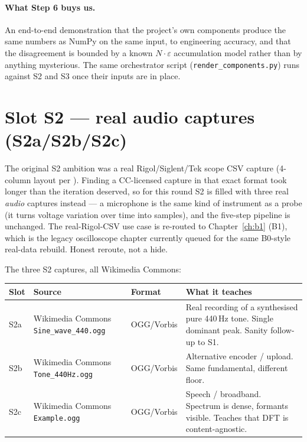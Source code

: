 \documentclass[11pt,a4paper,openany]{book}
\begin{document}
\paragraph{What Step 6 buys us.} An end-to-end demonstration that the
project's own components produce the same numbers as NumPy on the same
input, to engineering accuracy, and that the disagreement is bounded
by a known $N \cdot \varepsilon$ accumulation model rather than by
anything mysterious. The same orchestrator script
(\texttt{render\_components.py}) runs against S2 and S3 once their
inputs are in place.

\clearpage
\section{Slot S2 --- real audio captures (S2a/S2b/S2c)}
\label{sec:s2}

\begin{tcolorbox}[colback=codebg,colframe=black!40,arc=2pt,
                  title={S2 scope-restructure note},fonttitle=\bfseries\small,
                  coltitle=black,colbacktitle=codebg!80!black!8]
The original S2 ambition was a real Rigol/Siglent/Tek scope CSV
capture (4-column layout per \cite{rg272996569}). Finding a CC-licensed
capture in that exact format took longer than the iteration deserved,
so for this round S2 is filled with three real \emph{audio} captures
instead --- a microphone is the same kind of instrument as a probe (it
turns voltage variation over time into samples), and the
five-step pipeline is unchanged. The real-Rigol-CSV use case is
re-routed to Chapter~\ref{ch:b1} (B1), which is the legacy
oscilloscope chapter currently queued for the same B0-style real-data
rebuild. Honest reroute, not a hide.
\end{tcolorbox}

The three S2 captures, all Wikimedia Commons:

\begin{longtable}{p{1.5cm}p{5.5cm}p{2.5cm}p{4.5cm}}
\toprule
\textbf{Slot} & \textbf{Source} & \textbf{Format} & \textbf{What it teaches} \\
\midrule
\endhead
S2a & Wikimedia Commons \texttt{Sine\_wave\_440.ogg} & OGG/Vorbis & Real recording of a synthesised pure 440\,Hz tone. Single dominant peak. Sanity follow-up to S1. \\
S2b & Wikimedia Commons \texttt{Tone\_440Hz.ogg} & OGG/Vorbis & Alternative encoder / upload. Same fundamental, different floor. \\
S2c & Wikimedia Commons \texttt{Example.ogg} & OGG/Vorbis & Speech / broadband. Spectrum is dense, formants visible. Teaches that DFT is content-agnostic. \\
\bottomrule
\end{longtable}
\end{document}

